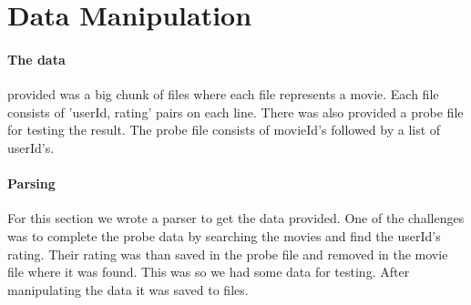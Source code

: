 \section{Data Manipulation}
\paragraph{The data} provided was a big chunk of files where each file represents a movie.
Each file consists of 'userId, rating' pairs on each line.
There was also provided a probe file for testing the result.
The probe file consists of movieId's followed by a list of userId's.

\paragraph{Parsing}
For this section we wrote a parser to get the data provided.
One of the challenges was to complete the probe data by searching the movies and find the userId's rating.
Their rating was than saved in the probe file and removed in the movie file where it was found.
This was so we had some data for testing.
After manipulating the data it was saved to files.